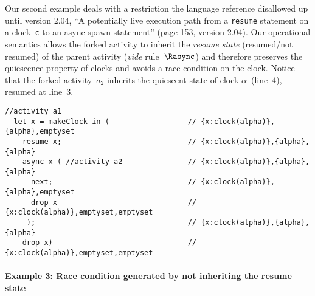 Our second example deals with a restriction the language reference
disallowed up until version 2.04, ``A potentially live execution path
from a \texttt{resume} statement on a clock~\texttt{c} to an async
spawn statement'' (page 153, version 2.04).
Our operational semantics allows the forked activity to inherit the
\emph{resume state} (resumed/not resumed) of the parent activity
(\textit{vide} rule~$\Rasync$) and therefore preserves the quiescence
property of clocks and avoids a race condition on the clock. Notice
that the forked activity~$a_2$ inherits the quiescent state of clock
$\alpha$~(line~4), resumed at line~3.
\begin{lstlisting}[numbers=right]
  //activity a1
  let x = makeClock in (                  // {x:clock(alpha)},{alpha},emptyset
    resume x;                             // {x:clock(alpha)},{alpha},{alpha}
    async x ( //activity a2               // {x:clock(alpha)},{alpha},{alpha}
      next;                               // {x:clock(alpha)},{alpha},emptyset
      drop x                              // {x:clock(alpha)},emptyset,emptyset
     );                                   // {x:clock(alpha)},{alpha},{alpha}
    drop x)                               // {x:clock(alpha)},emptyset,emptyset
\end{lstlisting}

\paragraph{Example 3: Race condition generated by not inheriting the
  resume state}

